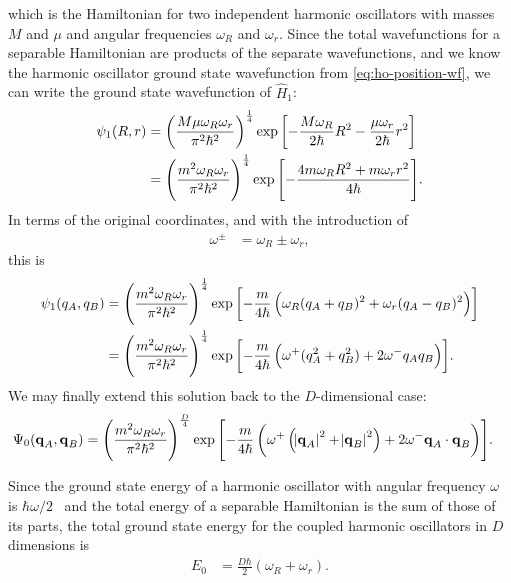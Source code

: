 which is the Hamiltonian for two independent harmonic oscillators with masses $M$ and $\mu$ and angular frequencies $\omega_R$ and $\omega_r$.
Since the total wavefunctions for a separable Hamiltonian are products of the separate wavefunctions, and we know the harmonic oscillator ground state wavefunction from \vref{eq:ho-position-wf}, we can write the ground state wavefunction of $\hat{H}_1$:
\begin{subequations}
\begin{align}
	\psi_1(R, r)
	&= \left( \frac{M \mu \omega_R \omega_r}{\pi^2 \hbar^2} \right)^\frac{1}{4}
		\exp{\left[ -\frac{M \omega_R}{2 \hbar} R^2 - \frac{\mu \omega_r}{2 \hbar} r^2 \right]} \\
	&= \left( \frac{m^2 \omega_R \omega_r}{\pi^2 \hbar^2} \right)^\frac{1}{4}
		\exp{\left[ -\frac{4 m \omega_R R^2 + m \omega_r r^2}{4 \hbar} \right]}.
\end{align}
\end{subequations}
In terms of the original coordinates, and with the introduction of
\begin{align}
	\omega^\pm
	&= \omega_R \pm \omega_r,
\end{align}
this is
\begin{subequations} \label{eq:oscillators-wf-1d}
\begin{align}
	\psi_1(q_A, q_B)
	&= \left( \frac{m^2 \omega_R \omega_r}{\pi^2 \hbar^2} \right)^\frac{1}{4}
		\exp{\left[ -\frac{m}{4 \hbar} \left( \omega_R (q_A + q_B)^2 + \omega_r (q_A - q_B)^2 \right) \right]} \\
	&= \left( \frac{m^2 \omega_R \omega_r}{\pi^2 \hbar^2} \right)^\frac{1}{4}
		\exp{\left[ -\frac{m}{4 \hbar} \left( \omega^+ (q_A^2 + q_B^2) + 2 \omega^- q_A q_B \right) \right]}.
\end{align}
\end{subequations}
We may finally extend this solution back to the $D$-dimensional case:
\begin{align}
	\Psi_0(\bm{\mathbf{q}}_A, \bm{\mathbf{q}}_B)
	&= \left( \frac{m^2 \omega_R \omega_r}{\pi^2 \hbar^2} \right)^\frac{D}{4}
		\exp{\left[ -\frac{m}{4 \hbar} \left(
			\omega^+ \left( \abs{\bm{\mathbf{q}}_A}^2 + \abs{\bm{\mathbf{q}}_B}^2 \right)
			+ 2 \omega^- \bm{\mathbf{q}}_A \cdot \bm{\mathbf{q}}_B
		\right) \right]}.
\end{align}

Since the ground state energy of a harmonic oscillator with angular frequency $\omega$ is $\hbar \omega / 2$~\cite[438]{messiah1999quantum} and the total energy of a separable Hamiltonian is the sum of those of its parts, the total ground state energy for the coupled harmonic oscillators in $D$ dimensions is
\begin{align}
	E_0
	&= \frac{D \hbar}{2} (\omega_R + \omega_r).
		\label{eq:oscillators-energy-exact}
\end{align}


